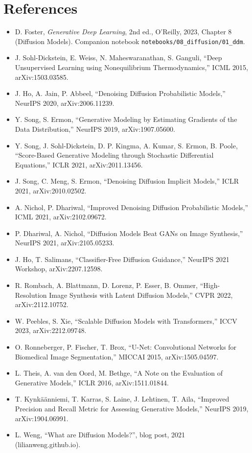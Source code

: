\documentclass[11pt]{article}
\theoremstyle{remark}
\begin{document}
\section*{References}
\begin{itemize}[leftmargin=1.5em]
\item D. Foster, \emph{Generative Deep Learning}, 2nd ed., O'Reilly, 2023, Chapter 8 (Diffusion Models). Companion notebook \texttt{notebooks/08\_diffusion/01\_ddm}.
\item J. Sohl-Dickstein, E. Weiss, N. Maheswaranathan, S. Ganguli, ``Deep Unsupervised Learning using Nonequilibrium Thermodynamics,'' ICML 2015, arXiv:1503.03585.
\item J. Ho, A. Jain, P. Abbeel, ``Denoising Diffusion Probabilistic Models,'' NeurIPS 2020, arXiv:2006.11239.
\item Y. Song, S. Ermon, ``Generative Modeling by Estimating Gradients of the Data Distribution,'' NeurIPS 2019, arXiv:1907.05600.
\item Y. Song, J. Sohl-Dickstein, D. P. Kingma, A. Kumar, S. Ermon, B. Poole, ``Score-Based Generative Modeling through Stochastic Differential Equations,'' ICLR 2021, arXiv:2011.13456.
\item J. Song, C. Meng, S. Ermon, ``Denoising Diffusion Implicit Models,'' ICLR 2021, arXiv:2010.02502.
\item A. Nichol, P. Dhariwal, ``Improved Denoising Diffusion Probabilistic Models,'' ICML 2021, arXiv:2102.09672.
\item P. Dhariwal, A. Nichol, ``Diffusion Models Beat GANs on Image Synthesis,'' NeurIPS 2021, arXiv:2105.05233.
\item J. Ho, T. Salimans, ``Classifier-Free Diffusion Guidance,'' NeurIPS 2021 Workshop, arXiv:2207.12598.
\item R. Rombach, A. Blattmann, D. Lorenz, P. Esser, B. Ommer, ``High-Resolution Image Synthesis with Latent Diffusion Models,'' CVPR 2022, arXiv:2112.10752.
\item W. Peebles, S. Xie, ``Scalable Diffusion Models with Transformers,'' ICCV 2023, arXiv:2212.09748.
\item O. Ronneberger, P. Fischer, T. Brox, ``U-Net: Convolutional Networks for Biomedical Image Segmentation,'' MICCAI 2015, arXiv:1505.04597.
\item L. Theis, A. van den Oord, M. Bethge, ``A Note on the Evaluation of Generative Models,'' ICLR 2016, arXiv:1511.01844.
\item T. Kynk\"a\"anniemi, T. Karras, S. Laine, J. Lehtinen, T. Aila, ``Improved Precision and Recall Metric for Assessing Generative Models,'' NeurIPS 2019, arXiv:1904.06991.
\item L. Weng, ``What are Diffusion Models?'', blog post, 2021 (lilianweng.github.io).
\end{itemize}
\end{document}
